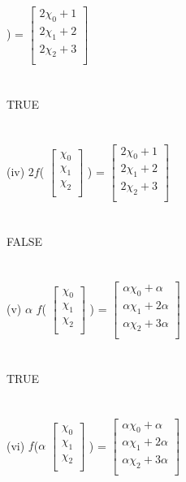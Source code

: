 \documentclass[11pt]{article}
\begin{document}
)
=
$
\begin{bmatrix}
{2\chi_{0} + 1}\\
{2\chi_{1} + 2}\\
{2\chi_{2} + 3}\\
\end{bmatrix}$
\\
\\
\\
TRUE
\\
\\
\\
(iv)
$2f$(
$
\begin{bmatrix}
{\chi_{0}}\\
{\chi_{1}}\\
{\chi_{2}}\\
\end{bmatrix}$
)
=
$
\begin{bmatrix}
{2\chi_{0} + 1}\\
{2\chi_{1} + 2}\\
{2\chi_{2} + 3}\\
\end{bmatrix}$
\\
\\
\\
FALSE
\\
\\
\\
(v)
$\alpha$ $f$(
$
\begin{bmatrix}
{\chi_{0}}\\
{\chi_{1}}\\
{\chi_{2}}\\
\end{bmatrix}$
)
=
$
\begin{bmatrix}
{\alpha\chi_{0} + \alpha}\\
{\alpha\chi_{1} + 2\alpha}\\
{\alpha\chi_{2} + 3\alpha}\\
\end{bmatrix}$
\\
\\
\\
TRUE
\\
\\
\\
(vi)
$f$($\alpha$
$
\begin{bmatrix}
{\chi_{0}}\\
{\chi_{1}}\\
{\chi_{2}}\\
\end{bmatrix}$
)
=
$
\begin{bmatrix}
{\alpha\chi_{0} + \alpha}\\
{\alpha\chi_{1} + 2\alpha}\\
{\alpha\chi_{2} + 3\alpha}\\
\end{bmatrix}$
\end{document}
